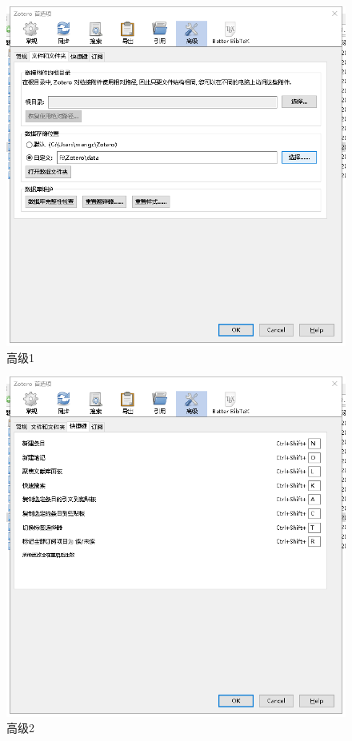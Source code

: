 \begin{figure}
	\centering
	\includegraphics[scale=0.8]{Fig/zotero7.png}
	\caption{\label{op7}高级1}
\end{figure}
\begin{figure}
	\centering
	\includegraphics[scale=0.8]{Fig/zotero8.png}
	\caption{\label{op8}高级2}
\end{figure}
